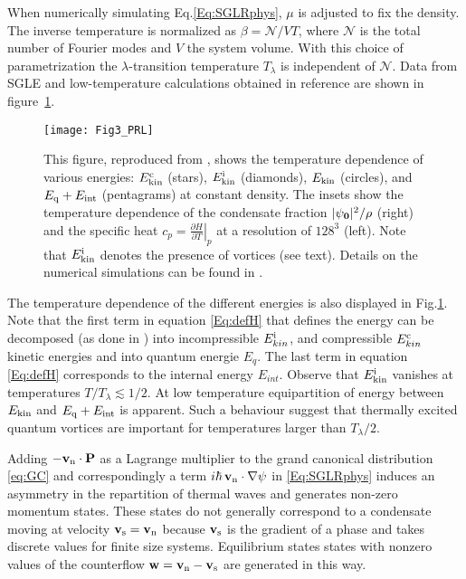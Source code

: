 \documentclass[sn-mathphys]{sn-jnl}%
\begin{document}
When numerically simulating Eq.\eqref{Eq:SGLRphys}, $\mu$ is adjusted to fix the density. The inverse temperature is normalized as $\beta=\mathcal{N}/VT$, where $\mathcal{N}$ is the total number of Fourier modes and $V$ the system volume. With this choice of parametrization the $\lambda$-transition temperature $T_\lambda$ is independent of $\mathcal{N}$. Data from SGLE and low-temperature calculations obtained in reference \cite{Krstulovic11} are shown in figure~\ref{Fig:Scan}.


\begin{figure}[htbp]
\centering
\texttt{[image: Fig3\_PRL]}
\caption{This figure, reproduced from \cite{Krstulovic11a}, shows the temperature dependence of various energies: $E_{\rm kin}^{\rm c}$ (stars), $E_{\rm kin}^{\rm i}$ (diamonds), $E_{\rm kin}$ (circles), and $E_{\rm q}+E_{\rm int}$ (pentagrams) at constant density. The insets show the temperature dependence of the condensate fraction $\lvert\psi_{\bf 0}\rvert^2/\rho$ (right) and the specific heat $c_{p}=\left.\frac{\partial H}{\partial T}\right\rvert_{p}$ at a resolution of $128^3$ (left). Note that $E_{\rm kin}^{\rm i}$ denotes the presence of vortices (see text). {Details on the numerical simulations can be found in \cite{Krstulovic11a}.}}
\label{Fig:Scan}
\end{figure}

The temperature dependence of the different energies is also displayed in Fig.\ref{Fig:Scan}.
Note that the first term in equation \eqref{Eq:defH} that defines the energy can be decomposed (as done in \cite{Nore97a,Nore97b}) into incompressible $E_{kin}^{\rm i}$, and compressible $E_{kin}^{\rm c}$ kinetic energies and into quantum energie $E_{q}$. The last term  in equation \eqref{Eq:defH} corresponds  to the internal energy $E_{int}$. Observe that $E_{\rm kin}^{\rm i}$ vanishes at temperatures $T/T_{\lambda}\lesssim1/2$. 
At low temperature equipartition of energy between $E_{\rm kin}$ and $E_{\rm q}+E_{\rm int}$ is apparent. Such a behaviour suggest that thermally excited quantum vortices are important for temperatures larger than $T_\lambda/2$.


Adding $-{\bf v_{\rm n}}\cdot {\bf P}$ as a Lagrange multiplier to the grand canonical distribution \eqref{eq:GC} and correspondingly a term
$i\hbar\,{\bf v_{\rm n}}\cdot{\bf\nabla} \psi$ in \eqref{Eq:SGLRphys} induces an asymmetry in the repartition of thermal waves and generates non-zero momentum states. These states do not generally correspond to a condensate moving at velocity ${\bf v_{\rm s}}={\bf v_{\rm n}}$ because ${\bf v_{\rm s}}$ is the gradient of a phase and takes discrete values for finite size systems.
%
Equilibrium states states with nonzero values of the counterflow ${\bf w}={\bf v_{\rm n}-v_{\rm s}}$ are generated in this way. 
\end{document}
